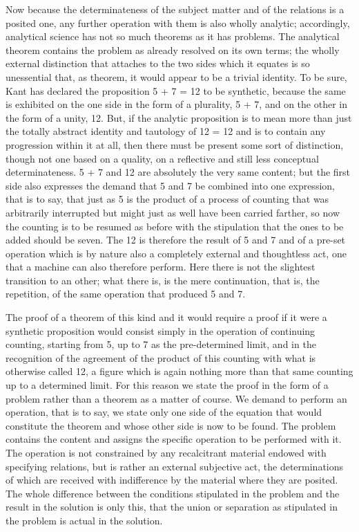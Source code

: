 Now because the determinateness of the subject matter
and of the relations is a posited one,
any further operation with them is also wholly analytic;
accordingly, analytical science has not so much theorems
as it has problems.
The analytical theorem contains the problem
as already resolved on its own terms;
the wholly external distinction that attaches
to the two sides which it equates is so unessential
that, as theorem, it would appear to be a trivial identity.
To be sure, Kant has declared the proposition
5 + 7 = 12 to be synthetic,
because the same is exhibited on the one side in the form
of a plurality, 5 + 7,
and on the other in the form of a unity, 12.
But, if the analytic proposition is
to mean more than just the totally abstract
identity and tautology of 12 = 12
and is to contain any progression within it at all,
then there must be present some sort of distinction,
though not one based on a quality,
on a reflective and still less conceptual determinateness.
5 + 7 and 12 are absolutely the very same content;
but the first side also expresses the demand
that 5 and 7 be combined into one expression,
that is to say, that just as 5 is the product
of a process of counting that was arbitrarily interrupted
but might just as well have been carried farther,
so now the counting is to be resumed as
before with the stipulation that the
ones to be added should be seven.
The 12 is therefore the result of 5 and 7
and of a pre-set operation
which is by nature also
a completely external and thoughtless act,
one that a machine can also therefore perform.
Here there is not the slightest transition to an other;
what there is, is the mere continuation,
that is, the repetition, of the same operation
that produced 5 and 7.

The proof of a theorem of this kind
and it would require a proof if
it were a synthetic proposition
would consist simply in the operation of
continuing counting, starting from 5,
up to 7 as the pre-determined limit,
and in the recognition of the
agreement of the product of this counting
with what is otherwise called 12,
a figure which is again nothing more
than that same counting up to a determined limit.
For this reason we state the proof
in the form of a problem rather than a theorem
as a matter of course.
We demand to perform an operation,
that is to say,
we state only one side of the equation
that would constitute the theorem
and whose other side is now to be found.
The problem contains the content and
assigns the specific operation to be performed with it.
The operation is not constrained by
any recalcitrant material endowed with specifying relations,
but is rather an external subjective act,
the determinations of which are received
with indifference by the material where they are posited.
The whole difference between
the conditions stipulated in the problem
and the result in the solution is only this,
that the union or separation as stipulated
in the problem is actual in the solution.

